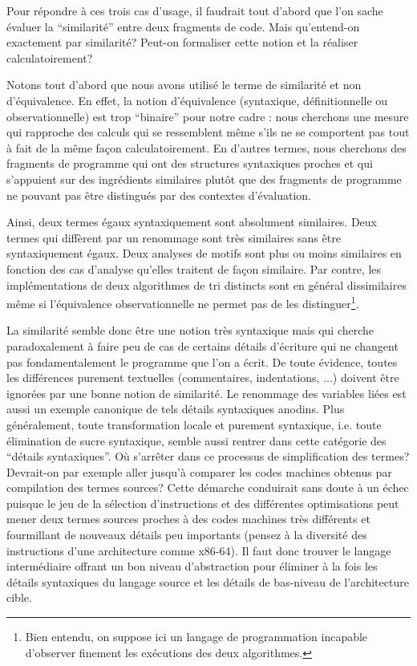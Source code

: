 Pour répondre à ces trois cas d'usage, il faudrait tout d'abord que
l'on sache évaluer la ``similarité'' entre deux fragments de
code. Mais qu'entend-on exactement par similarité? Peut-on
formaliser cette notion et la réaliser calculatoirement?

Notons tout d'abord que nous avons utilisé le terme de similarité et
non d'équivalence. En effet, la notion d'équivalence (syntaxique,
définitionnelle ou observationnelle) est trop ``binaire'' pour notre
cadre : nous cherchons une mesure qui rapproche des calculs qui se
ressemblent même s'ils ne se comportent pas tout à fait de la même
façon calculatoirement. En d'autres termes, nous cherchons des
fragments de programme qui ont des structures syntaxiques proches et
qui s'appuient sur des ingrédients similaires plutôt que des fragments
de programme ne pouvant pas être distingués par des contextes
d'évaluation.

Ainsi, deux termes égaux syntaxiquement sont absolument similaires.
Deux termes qui diffèrent par un renommage sont très similaires sans
être syntaxiquement égaux. Deux analyses de motifs sont plus ou
moins similaires en fonction des cas d'analyse qu'elles traitent
de façon similaire. Par contre, les implémentations de deux
algorithmes de tri distincts sont en général dissimilaires
même si l'équivalence observationnelle ne permet pas de les
distinguer\footnote{Bien entendu, on suppose ici
un langage de programmation incapable d'observer finement
les exécutions des deux algorithmes.}.

La similarité semble donc être une notion très syntaxique mais qui
cherche paradoxalement à faire peu de cas de certains détails
d'écriture qui ne changent pas fondamentalement le programme que l'on
a écrit. De toute évidence, toutes les différences purement textuelles
(commentaires, indentations, ...) doivent être ignorées par une bonne
notion de similarité. Le renommage des variables liées est aussi un
exemple canonique de tels détails syntaxiques anodins. Plus
généralement, toute transformation locale et purement syntaxique,
i.e. toute élimination de sucre syntaxique, semble aussi rentrer dans
cette catégorie des ``détails syntaxiques''. Où s'arrêter dans ce
processus de simplification des termes? Devrait-on par exemple aller
jusqu'à comparer les codes machines obtenus par compilation des termes
sources? Cette démarche conduirait sans doute à un échec puisque le
jeu de la sélection d'instructions et des différentes optimisations
peut mener deux termes sources proches à des codes machines très différents
et fourmillant de nouveaux détails peu importants (pensez à la
diversité des instructions d'une architecture comme x86-64). Il faut
donc trouver le langage intermédiaire offrant un bon niveau
d'abstraction pour éliminer à la fois les détails syntaxiques
du langage source et les détails de bas-niveau de l'architecture cible.

